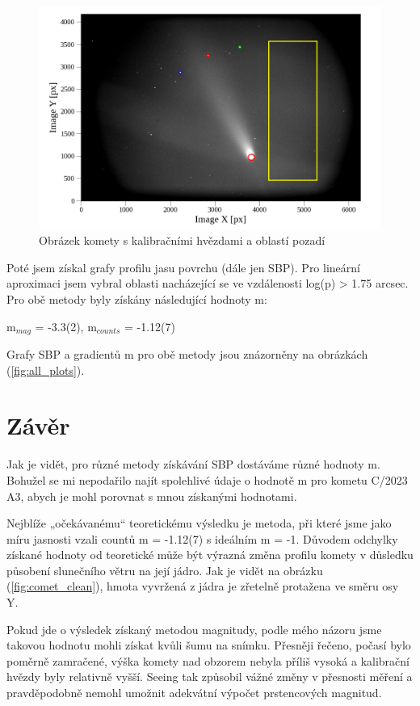 \documentclass[a4paper,11pt]{article}
\begin{document}
            \begin{figure}[H]
                \centering
                \includegraphics[scale=0.6]{comet.png}
                \captionsetup{justification=centering, font=footnotesize}
                \caption{Obrázek komety s kalibračními hvězdami a oblastí pozadí}
                \label{fig:comet}
            \end{figure}
            Poté jsem získal grafy profilu jasu povrchu (dále jen SBP). Pro lineární aproximaci jsem vybral oblasti nacházející se ve vzdálenosti log(p) > 1.75 arcsec. Pro obě metody byly získány následující hodnoty m:
            \begin{center}
                m$_{mag}$ = -3.3(2), m$_{counts}$ = -1.12(7)
            \end{center}
            Grafy SBP a gradientů m pro obě metody jsou znázorněny na obrázkách (\ref{fig:all_plots}).

        \section{Závěr}
            Jak je vidět, pro různé metody získávání SBP dostáváme různé hodnoty m. Bohužel se mi nepodařilo najít spolehlivé údaje o hodnotě m pro kometu C/2023 A3, abych je mohl porovnat s mnou získanými hodnotami. 
            \par Nejblíže „očekávanému“ teoretickému výsledku je metoda, při které jsme jako míru jasnosti vzali countů m = -1.12(7) s ideálním m = -1. Důvodem odchylky získané hodnoty od teoretické může být výrazná změna profilu komety v důsledku působení slunečního větru na její jádro. Jak je vidět na obrázku (\ref{fig:comet_clean}), hmota vyvržená z jádra je zřetelně protažena ve směru osy Y. 
            \par Pokud jde o výsledek získaný metodou magnitudy, podle mého názoru jsme takovou hodnotu mohli získat kvůli šumu na snímku. Přesněji řečeno, počasí bylo poměrně zamračené, výška komety nad obzorem nebyla příliš vysoká a kalibrační hvězdy byly relativně vyšší. Seeing tak způsobil vážné změny v přesnosti měření a pravděpodobně nemohl umožnit adekvátní výpočet prstencových magnitud. 
            
\end{document}
